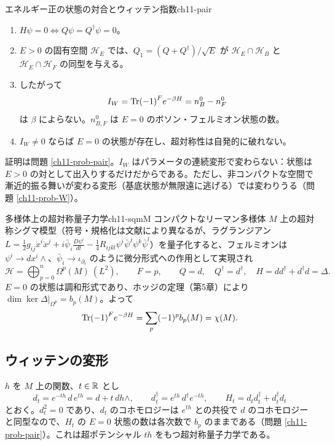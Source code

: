 \begin{myprop}{エネルギー正の状態の対合とウィッテン指数}{ch11-pair}
\begin{enumerate}
\item $H\psi=0\iff Q\psi=Q^\dagger\psi=0$。
\item $E>0$ の固有空間 $\mathcal H_E$ では、$Q_1=(Q+Q^\dagger)/\sqrt E$ が $\mathcal H_E\cap\mathcal H_B$ と $\mathcal H_E\cap\mathcal H_F$ の同型を与える。
\item したがって
\[
I_W=\Tr(-1)^Fe^{-\beta H}=n_B^0-n_F^0
\]
は $\beta$ によらない。$n_{B,F}^0$ は $E=0$ のボソン・フェルミオン状態の数。
\item $I_W\neq0$ ならば $E=0$ の状態が存在し、超対称性は自発的に破れない。
\end{enumerate}
\end{myprop}
証明は問題 \ref{ch11-prob-pair}。$I_W$ はパラメータの連続変形で変わらない：状態は $E>0$ の対として出入りするだけだからである。ただし、非コンパクトな空間で漸近的振る舞いが変わる変形（基底状態が無限遠に逃げる）では変わりうる（問題 \ref{ch11-prob-W}）。

\begin{myex}{多様体上の超対称量子力学}{ch11-sqmM}
コンパクトなリーマン多様体 $M$ 上の超対称シグマ模型（符号・規格化は文献により異なるが、ラグランジアン $L=\tfrac12g_{ij}\dot x^i\dot x^j+i\bar\psi_i\tfrac{D\psi^i}{dt}-\tfrac14R_{ijkl}\psi^i\bar\psi^j\psi^k\bar\psi^l$）を量子化すると、フェルミオンは $\psi^i\to dx^i\wedge$、$\bar\psi_i\to\iota_{\partial_i}$ のように微分形式への作用として実現され
\[
\mathcal H=\bigoplus_{p=0}^n\Omega^p(M)\ (L^2),\qquad F=p,\qquad Q=d,\quad Q^\dagger=d^\dagger,\quad H=dd^\dagger+d^\dagger d=\Delta .
\]
$E=0$ の状態は調和形式であり、ホッジの定理（第5章）により $\dim\ker\Delta|_{\Omega^p}=b_p(M)$。よって
\[
\Tr(-1)^Fe^{-\beta H}=\sum_p(-1)^pb_p(M)=\chi(M).
\]
\end{myex}

\subsection{ウィッテンの変形}
$h$ を $M$ 上の関数、$t\in\mathbb{R}$ とし
\[
d_t=e^{-th}\,d\,e^{th}=d+t\,dh\wedge,\qquad d_t^\dagger=e^{th}\,d^\dagger e^{-th},\qquad H_t=d_td_t^\dagger+d_t^\dagger d_t
\]
とおく。$d_t^2=0$ であり、$d_t$ のコホモロジーは $e^{th}$ との共役で $d$ のコホモロジーと同型なので、$H_t$ の $E=0$ 状態の数は各次数で $b_p$ のままである（問題 \ref{ch11-prob-pair}）。これは超ポテンシャル $th$ をもつ超対称量子力学である。

